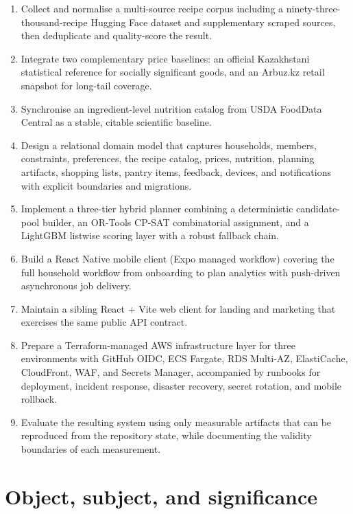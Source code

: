 \begin{enumerate}
\item Collect and normalise a multi-source recipe corpus including a ninety-three-thousand-recipe Hugging Face dataset and supplementary scraped sources, then deduplicate and quality-score the result.
\item Integrate two complementary price baselines: an official Kazakhstani statistical reference for socially significant goods, and an Arbuz.kz retail snapshot for long-tail coverage.
\item Synchronise an ingredient-level nutrition catalog from USDA FoodData Central as a stable, citable scientific baseline.
\item Design a relational domain model that captures households, members, constraints, preferences, the recipe catalog, prices, nutrition, planning artifacts, shopping lists, pantry items, feedback, devices, and notifications with explicit boundaries and migrations.
\item Implement a three-tier hybrid planner combining a deterministic candidate-pool builder, an OR-Tools CP-SAT combinatorial assignment, and a LightGBM listwise scoring layer with a robust fallback chain.
\item Build a React Native mobile client (Expo managed workflow) covering the full household workflow from onboarding to plan analytics with push-driven asynchronous job delivery.
\item Maintain a sibling React + Vite web client for landing and marketing that exercises the same public API contract.
\item Prepare a Terraform-managed AWS infrastructure layer for three environments with GitHub OIDC, ECS Fargate, RDS Multi-AZ, ElastiCache, CloudFront, WAF, and Secrets Manager, accompanied by runbooks for deployment, incident response, disaster recovery, secret rotation, and mobile rollback.
\item Evaluate the resulting system using only measurable artifacts that can be reproduced from the repository state, while documenting the validity boundaries of each measurement.
\end{enumerate}

\section{Object, subject, and significance}

